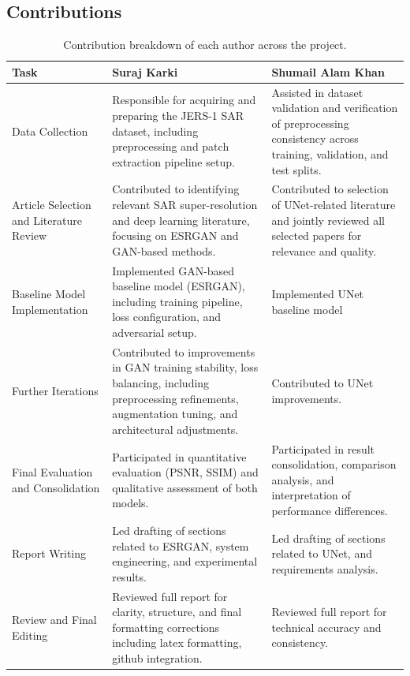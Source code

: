 \documentclass[conference]{IEEEtran}
\begin{document}
\subsection{Contributions}
\begin{table}[h!]
    \centering
    \renewcommand{\arraystretch}{1.3}
    \begin{tabularx}{\textwidth}{p{5cm}XX}
    \toprule
    \rowcolor{gray!20} \textbf{Task} & \textbf{Suraj Karki} & \textbf{Shumail Alam Khan} \\
    \midrule
    
    Data Collection & Responsible for acquiring and preparing the JERS-1 SAR dataset, including preprocessing and patch extraction pipeline setup. & Assisted in dataset validation and verification of preprocessing consistency across training, validation, and test splits. \\
    
    Article Selection and Literature Review & Contributed to identifying relevant SAR super-resolution and deep learning literature, focusing on ESRGAN and GAN-based methods. & Contributed to selection of UNet-related literature and jointly reviewed all selected papers for relevance and quality. \\
    
    Baseline Model Implementation & Implemented GAN-based baseline model (ESRGAN), including training pipeline, loss configuration, and adversarial setup. & Implemented UNet baseline model \\
    
    Further Iterations & Contributed to improvements in GAN training stability, loss balancing, including preprocessing refinements, augmentation tuning, and architectural adjustments. & Contributed to UNet improvements. \\
    
    Final Evaluation and Consolidation & Participated in quantitative evaluation (PSNR, SSIM) and qualitative assessment of both models. & Participated in result consolidation, comparison analysis, and interpretation of performance differences. \\
    
    Report Writing & Led drafting of sections related to ESRGAN, system engineering, and experimental results. & Led drafting of sections related to UNet, and requirements analysis. \\
    
    Review and Final Editing & Reviewed full report for clarity, structure, and final formatting corrections including latex formatting, github integration. & Reviewed full report for technical accuracy and consistency. \\
    
    \bottomrule
    \end{tabularx}
    \caption{Contribution breakdown of each author across the project.}
    \label{tab:author-contributions}
    \end{table}
\end{document}
